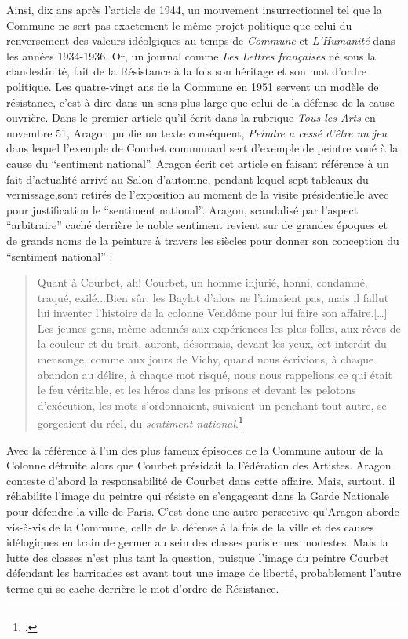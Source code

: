 Ainsi, dix ans après l'article de 1944, un mouvement insurrectionnel tel que la Commune ne sert pas exactement le même projet politique que celui du renversement des valeurs idéolgiques au temps de \emph{Commune} et \emph{L'Humanité} dans les années 1934-1936. Or, un journal comme \emph{Les Lettres françaises} né sous la clandestinité, fait de la Résistance à la fois son héritage et son mot d'ordre politique. Les quatre-vingt ans de la Commune en 1951 servent un modèle de résistance, c'est-à-dire dans un sens plus large que celui de la défense de la cause ouvrière. Dans le premier article qu'il écrit dans la rubrique \emph{Tous les Arts} en novembre 51, Aragon publie un texte conséquent, \emph{Peindre a cessé d'être un jeu} dans lequel l'exemple de Courbet communard sert d'exemple de peintre voué à la cause du \enquote{sentiment national}. Aragon écrit cet article en faisant référence à un fait d'actualité arrivé au Salon d'automne, pendant lequel sept tableaux du vernissage,sont retirés de l'exposition au moment de la visite présidentielle avec pour justification le \enquote{sentiment national}. Aragon, scandalisé par l'aspect \enquote{arbitraire} caché derrière le noble sentiment revient sur de grandes époques et de grands noms de la peinture à travers les siècles pour donner son conception du \enquote{sentiment national} : 
\begin{quote}
Quant à Courbet, ah! Courbet, un homme injurié, honni, condamné, traqué, exilé...Bien sûr, les Baylot d'alors ne l'aimaient pas, mais il fallut lui inventer l'histoire de la colonne Vendôme pour lui faire son affaire.[…] Les jeunes gens, même adonnés aux expériences les plus folles, aux rêves de la couleur et du trait, auront, désormais, devant les yeux, cet interdit du mensonge, comme aux jours de Vichy, quand nous écrivions, à chaque abandon au délire, à chaque mot risqué, nous nous rappelions ce qui était le feu véritable, et les héros dans les prisons et devant les pelotons d'exécution, les mots s'ordonnaient, suivaient un penchant tout autre, se gorgeaient du réel, du \emph{sentiment national}.\footcite{courbetcommunard}\end{quote}

Avec la référence à l'un des plus fameux épisodes de la Commune autour de la Colonne détruite alors que Courbet présidait la Fédération des Artistes. Aragon conteste d'abord la responsabilité de Courbet dans cette affaire. Mais, surtout, il réhabilite l'image du peintre qui résiste en s'engageant dans la Garde Nationale pour défendre la ville de Paris. C'est donc une autre persective qu'Aragon aborde vis-à-vis de la Commune, celle de la défense à la fois de la ville et des causes idélogiques en train de germer au sein des classes parisiennes modestes. Mais la lutte des classes n'est plus tant la question, puisque l'image du peintre Courbet défendant les barricades est avant tout une image de liberté, probablement l'autre terme qui se cache derrière le mot d'ordre de Résistance. 

